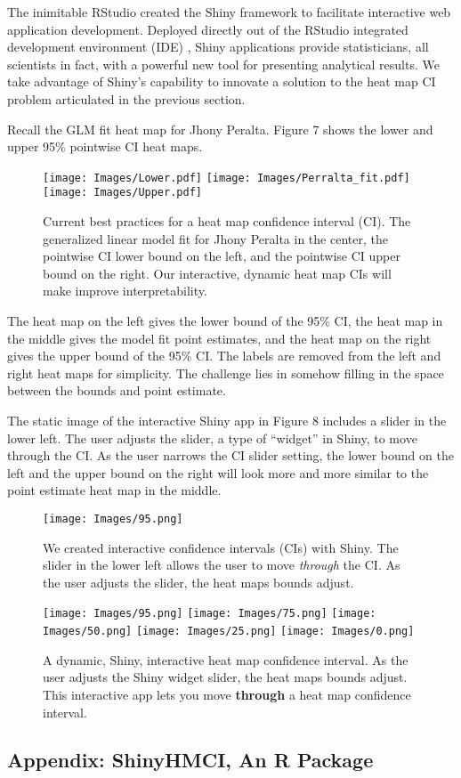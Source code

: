\documentclass{article}
\begin{document}
The inimitable RStudio created the Shiny framework to facilitate interactive web application development. Deployed directly out of the RStudio integrated development environment (IDE) \citep{IDE}, Shiny applications provide statisticians, all scientists in fact, with a powerful new tool for presenting analytical results. We take advantage of Shiny's capability to innovate a solution to the heat map CI problem articulated in the previous section.

Recall the GLM fit heat map for Jhony Peralta. Figure 7 shows the lower and upper 95\% pointwise CI heat maps.

  \begin{figure}[H]
	\centering
	\texttt{[image: Images/Lower.pdf]}
	\texttt{[image: Images/Perralta\_fit.pdf]}
	\texttt{[image: Images/Upper.pdf]}
	\caption{Current best practices for a heat map confidence interval (CI). The generalized linear model fit for Jhony Peralta in the center, the pointwise CI lower bound on the left, and the pointwise CI upper bound on the right. Our interactive, dynamic heat map CIs will make improve interpretability.} 
	\end{figure}
The heat map on the left gives the lower bound of the 95\% CI, the heat map in the middle gives the model fit point estimates, and the heat map on the right gives the upper bound of the 95\% CI. The labels are removed from the left and right heat maps for simplicity. The challenge lies in somehow filling in the space between the bounds and point estimate.

The static image of the interactive Shiny app in Figure 8 includes a slider in the lower left. The user adjusts the slider, a type of ``widget'' in Shiny, to move through the CI. As the user narrows the CI slider setting, the lower bound on the left and the upper bound on the right will look more and more similar to the point estimate heat map in the middle.

  \begin{figure}[H]
	\centering
	\texttt{[image: Images/95.png]}
	\caption{We created interactive confidence intervals (CIs) with Shiny. The slider in the lower left allows the user to move {\it through} the CI. As the user adjusts the slider, the heat maps bounds adjust.} 
	\end{figure}



  \begin{figure}[H]
	\centering
	\texttt{[image: Images/95.png]}
	\texttt{[image: Images/75.png]}
	\texttt{[image: Images/50.png]}
	\texttt{[image: Images/25.png]}
	\texttt{[image: Images/0.png]}
	\caption{A dynamic, Shiny, interactive heat map confidence interval. As the user adjusts the Shiny widget slider, the heat maps bounds adjust. This interactive app lets you move {\bf through} a heat map confidence interval.} 
	\end{figure}

  
\subsection{Appendix: ShinyHMCI, An R Package}


\end{document}
